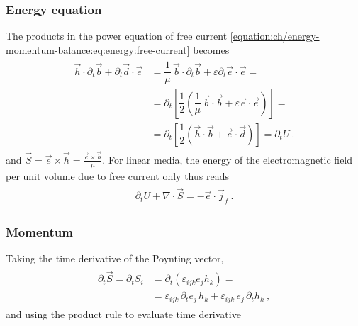 \documentclass[letterpaper,10pt,english]{jupyterBook}
\begin{document}
\subsubsection{Energy equation}
\label{\detokenize{ch/energy-momentum-balance:energy-equation}}
\sphinxAtStartPar
The products in the power equation of free current \eqref{equation:ch/energy-momentum-balance:eq:energy:free-current} becomes
\begin{equation*}
\begin{split}\begin{aligned}
  \vec{h} \cdot \partial_t \vec{b} + \partial_t \vec{d} \cdot \vec{e} 
  & = \dfrac{1}{\mu} \, \vec{b} \cdot \partial_t \vec{b} + \varepsilon \partial_t \vec{e} \cdot \vec{e}  = \\
  & = \partial_t \left[ \dfrac{1}{2} \left( \dfrac{1}{\mu} \, \vec{b} \cdot \vec{b} + \varepsilon \vec{e} \cdot \vec{e} \right) \right] = \\
  & = \partial_t \left[ \dfrac{1}{2} \left( \vec{h} \cdot \vec{b} + \vec{e} \cdot \vec{d} \right) \right] = \partial_t U \ .
\end{aligned}\end{split}
\end{equation*}
\sphinxAtStartPar
and \(\vec{S} = \vec{e} \times \vec{h} = \frac{\vec{e} \times \vec{b}}{\mu}\).
For linear media, the energy of the electromagnetic field per unit volume due to free current only thus reads
\begin{equation*}
\begin{split}\begin{aligned}
 \partial_t U + \nabla \cdot \vec{S} = - \vec{e} \cdot \vec{j}_f \ .
\end{aligned}\end{split}
\end{equation*}

\subsubsection{Momentum}
\label{\detokenize{ch/energy-momentum-balance:momentum}}
\sphinxAtStartPar
Taking the time derivative of the Poynting vector,
\begin{equation*}
\begin{split}\begin{aligned}
  \partial_t \vec{S} = \partial_t S_i 
  & = \partial_t \left( \varepsilon_{ijk} e_j h_k \right) = \\
  & = \varepsilon_{ijk} \, \partial_t e_j \, h_k + \varepsilon_{ijk} \, e_j \, \partial_t h_k  \ ,
\end{aligned}\end{split}
\end{equation*}
\sphinxAtStartPar
and using the product rule to evaluate time derivative
\end{document}

